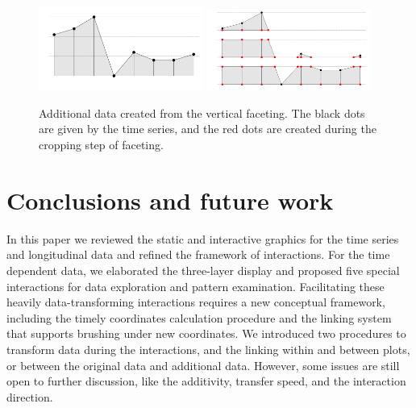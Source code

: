 \documentclass[12pt]{article}
\begin{document}
\begin{itemize}
\begin{center}
\begin{figure}[H]
\begin{centering}
\includegraphics[width=0.48\textwidth]{graph/pipeline-23-1}
\includegraphics[width=0.48\textwidth]{graph/pipeline-23-2}
\par\end{centering}
\caption{\label{fig:Additional-data}Additional data created from the vertical
faceting. The black dots are given by the time series, and the red
dots are created during the cropping step of faceting.}
\end{figure}
\par\end{center}

\end{itemize}

\section{Conclusions and future work}

In this paper we reviewed the static and interactive graphics for
the time series and longitudinal data and refined the framework of
interactions. For the time dependent data, we elaborated the
three-layer display and proposed five special interactions for data
exploration and pattern examination. Facilitating these heavily
data-transforming interactions requires a new conceptual framework,
including the timely coordinates calculation procedure and
the linking system that supports brushing under new coordinates.
We introduced two procedures to transform data during the
interactions, and the linking within and between plots, or
between the original data and additional data.
However, some issues are still open to further discussion,
like the additivity, transfer speed, and the interaction direction.
\end{document}
